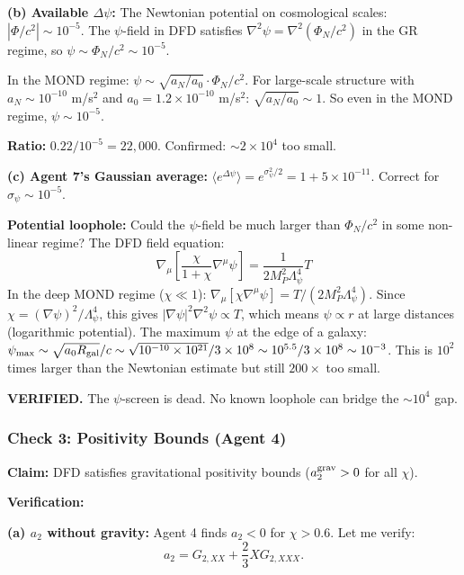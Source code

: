 \documentclass[11pt,a4paper]{article}
\begin{document}
\textbf{(b) Available $\Delta\psi$:} The Newtonian potential on cosmological scales: $|\Phi/c^2| \sim 10^{-5}$. The $\psi$-field in DFD satisfies $\nabla^2\psi = \nabla^2(\Phi_N/c^2)$ in the GR regime, so $\psi \sim \Phi_N/c^2 \sim 10^{-5}$.

In the MOND regime: $\psi \sim \sqrt{a_N/a_0} \cdot \Phi_N/c^2$. For large-scale structure with $a_N \sim 10^{-10}$ m/s$^2$ and $a_0 = 1.2 \times 10^{-10}$ m/s$^2$: $\sqrt{a_N/a_0} \sim 1$. So even in the MOND regime, $\psi \sim 10^{-5}$.

\textbf{Ratio:} $0.22/10^{-5} = 22{,}000$. Confirmed: $\sim 2 \times 10^4$ too small.

\textbf{(c) Agent 7's Gaussian average:} $\langle e^{\Delta\psi}\rangle = e^{\sigma_\psi^2/2} = 1 + 5 \times 10^{-11}$. Correct for $\sigma_\psi \sim 10^{-5}$.

\textbf{Potential loophole:} Could the $\psi$-field be much larger than $\Phi_N/c^2$ in some non-linear regime? The DFD field equation:
\begin{equation}
\nabla_\mu\left[\frac{\chi}{1+\chi}\nabla^\mu\psi\right] = \frac{1}{2M_P^2\Lambda_\psi^4}T
\end{equation}
In the deep MOND regime ($\chi \ll 1$): $\nabla_\mu[\chi\nabla^\mu\psi] = T/(2M_P^2\Lambda_\psi^4)$. Since $\chi = (\nabla\psi)^2/\Lambda_\psi^4$, this gives $|\nabla\psi|^2 \nabla^2\psi \propto T$, which means $\psi \propto r$ at large distances (logarithmic potential). The maximum $\psi$ at the edge of a galaxy: $\psi_{\rm max} \sim \sqrt{a_0 R_{\rm gal}}/c \sim \sqrt{10^{-10} \times 10^{21}}/3\times10^8 \sim 10^{5.5}/3\times10^8 \sim 10^{-3}$. This is $10^2$ times larger than the Newtonian estimate but still $200\times$ too small.

\textcolor{dfdgreen}{\textbf{VERIFIED.}} The $\psi$-screen is dead. No known loophole can bridge the $\sim 10^4$ gap.

\subsubsection{Check 3: Positivity Bounds (Agent 4)}

\textbf{Claim:} DFD satisfies gravitational positivity bounds ($a_2^{\rm grav} > 0$ for all $\chi$).

\textbf{Verification:}

\textbf{(a) $a_2$ without gravity:} Agent 4 finds $a_2 < 0$ for $\chi > 0.6$. Let me verify:
\begin{equation}
a_2 = G_{2,XX} + \frac{2}{3}X G_{2,XXX}.
\end{equation}
\end{document}
